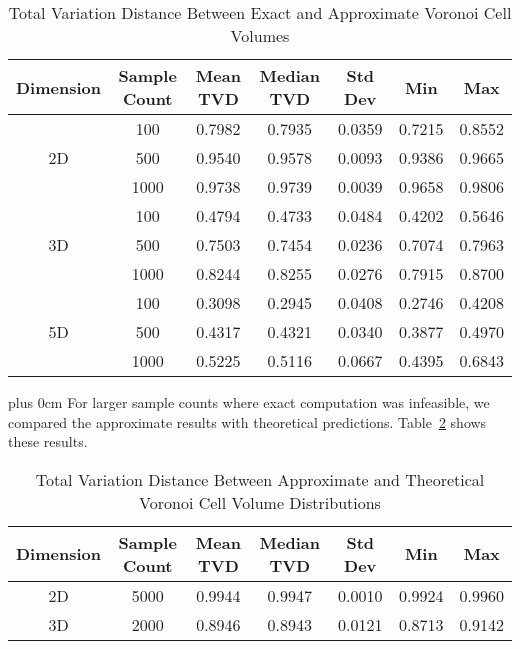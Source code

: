 \documentclass[11pt,a4paper]{article}
\newcommand{\justifytext}{\leftskip=0pt \rightskip=0pt plus 0cm}
\begin{document}
\begin{table}[h]
\centering
\caption{Total Variation Distance Between Exact and Approximate Voronoi Cell Volumes}
\label{table:voronoi-exact-approx}
\begin{tabular}{|c|c|c|c|c|c|c|}
\hline
\textbf{Dimension} & \textbf{Sample Count} & \textbf{Mean TVD} & \textbf{Median TVD} & \textbf{Std Dev} & \textbf{Min} & \textbf{Max} \\
\hline
\multirow{3}{*}{2D} & 100 & 0.7982 & 0.7935 & 0.0359 & 0.7215 & 0.8552 \\
 & 500 & 0.9540 & 0.9578 & 0.0093 & 0.9386 & 0.9665 \\
 & 1000 & 0.9738 & 0.9739 & 0.0039 & 0.9658 & 0.9806 \\
\hline
\multirow{3}{*}{3D} & 100 & 0.4794 & 0.4733 & 0.0484 & 0.4202 & 0.5646 \\
 & 500 & 0.7503 & 0.7454 & 0.0236 & 0.7074 & 0.7963 \\
 & 1000 & 0.8244 & 0.8255 & 0.0276 & 0.7915 & 0.8700 \\
\hline
\multirow{3}{*}{5D} & 100 & 0.3098 & 0.2945 & 0.0408 & 0.2746 & 0.4208 \\
 & 500 & 0.4317 & 0.4321 & 0.0340 & 0.3877 & 0.4970 \\
 & 1000 & 0.5225 & 0.5116 & 0.0667 & 0.4395 & 0.6843 \\
\hline
\end{tabular}
\end{table}

\justifytext
For larger sample counts where exact computation was infeasible, we compared the approximate results with theoretical predictions. Table~\ref{table:voronoi-theoretical} shows these results.

\begin{table}[h]
\centering
\caption{Total Variation Distance Between Approximate and Theoretical Voronoi Cell Volume Distributions}
\label{table:voronoi-theoretical}
\begin{tabular}{|c|c|c|c|c|c|c|}
\hline
\textbf{Dimension} & \textbf{Sample Count} & \textbf{Mean TVD} & \textbf{Median TVD} & \textbf{Std Dev} & \textbf{Min} & \textbf{Max} \\
\hline
2D & 5000 & 0.9944 & 0.9947 & 0.0010 & 0.9924 & 0.9960 \\
3D & 2000 & 0.8946 & 0.8943 & 0.0121 & 0.8713 & 0.9142 \\
\hline
\end{tabular}
\end{table}
\end{document}
